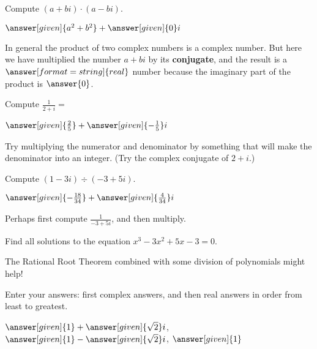 \documentclass[nooutcomes]{ximera}
\begin{document}
\begin{problem}
Compute $(a+bi) \cdot (a-bi)$.
\begin{prompt}
	$\answer[given]{a^2+b^2} + \answer[given]{0}i$
\end{prompt}
\begin{problem}
In general the product of two complex numbers is a complex number.  But here we have multiplied the number $a+bi$ by its
\textbf{conjugate}, and the result is a $\answer[format=string]{real}$ number because the imaginary part of the product is $\answer{0}$.   
\end{problem}
\end{problem}


\begin{problem}
Compute $\frac{1}{2+i} = $
\begin{prompt}
	$\answer[given]{\frac{2}{5}} + \answer[given]{-\frac{1}{5}}i$
\end{prompt}
\begin{hint}
Try multiplying the numerator and denominator by something that will make the denominator into an integer.  
(Try the complex conjugate of $2+i$.)
\end{hint}

\end{problem}



\begin{problem}
Compute $(1-3i) \div (-3+5i)$.
\begin{prompt}
	$\answer[given]{-\frac{18}{34}} + \answer[given]{\frac{4}{34}}i$
\end{prompt}
\begin{hint}
Perhaps first compute $\frac{1}{-3+5i}$, and then multiply.
\end{hint}
\end{problem}



\begin{problem}
Find all solutions to the equation $x^3-3x^2+5x-3=0$. 
\begin{hint} 
The Rational Root Theorem combined with some division of polynomials might help!
\end{hint}
Enter your answers: first complex answers, and then real answers in order from least to greatest.

\begin{prompt}
$\answer[given]{1} + \answer[given]{\sqrt{2}}i$, $\answer[given]{1} - \answer[given]{\sqrt{2}}i$, $\answer[given]{1}$
\end{prompt}
\end{problem}
\end{document}
